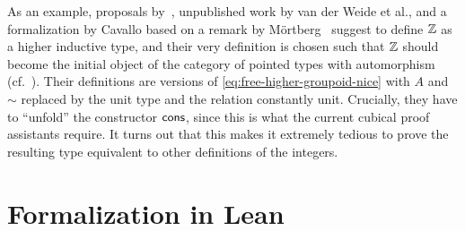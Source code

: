 \begin{remark}
As an example, proposals by~\citet{gun:squid}, unpublished
work by van der Weide et al., and a formalization by Cavallo based on a remark
by M\"ortberg~\citep{Evan:Squid} suggest to define $\mathbb Z$ as a higher inductive
type, and their very definition is chosen such that $\mathbb Z$ should become the
initial object of the category of pointed types with automorphism
(cf.\ ).
Their definitions are versions of \eqref{eq:free-higher-groupoid-nice} with
$A$ and $\sim$ replaced by the unit type and the relation constantly unit.
Crucially, they have to ``unfold'' the constructor $\mathsf{cons}$, since this is
what the current cubical proof assistants require.
It turns out that this makes it extremely tedious to prove the resulting
type equivalent to other definitions of the integers.
\end{remark}

\section{Formalization in Lean}\label{sec:paths-lean}







